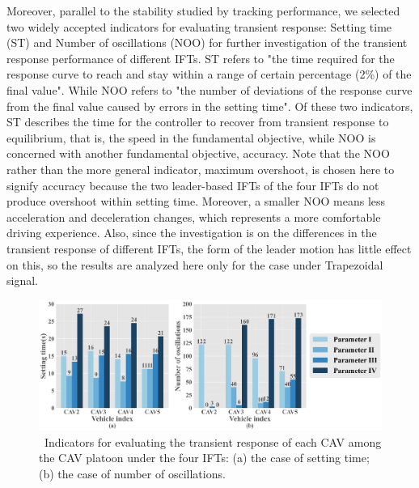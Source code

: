 \documentclass[a4paper]{cas-sc}
\begin{document}
Moreover, parallel to the stability studied by tracking performance, we selected two widely accepted indicators for evaluating transient response: Setting time (ST) and Number of oscillations (NOO) for further investigation of the transient response performance of different IFTs. ST refers to "the time required for the response curve to reach and stay within a range of certain percentage (2\%) of the final value". While NOO refers to "the number of deviations of the response curve from the final value caused by errors in the setting time". Of these two indicators, ST describes the time for the controller to recover from transient response to equilibrium, that is, the speed in the fundamental objective, while NOO is concerned with another fundamental objective, accuracy. Note that the NOO rather than the more general indicator, maximum overshoot, is chosen here to signify accuracy because the two leader-based IFTs of the four IFTs do not produce overshoot within setting time. Moreover, a smaller NOO means less acceleration and deceleration changes, which represents a more comfortable driving experience. Also, since the investigation is on the differences in the transient response of different IFTs, the form of the leader motion has little effect on this, so the results are analyzed here only for the case under Trapezoidal signal.

\begin{figure}

  \centering
  \includegraphics[width=14cm]{figs/fig6.png}
  \caption{~Indicators for evaluating the transient response of each CAV among the CAV platoon under the four IFTs: (a) the case of setting time; (b) the case of number of oscillations.}
  \label{fig6}
\end{figure}
\end{document}
